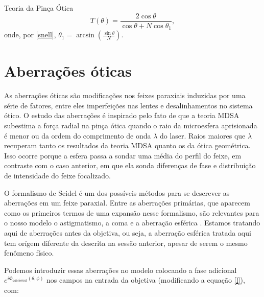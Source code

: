 \begin{chapter}{Teoria da Pinça Ótica}
\begin{equation}
T(\theta)=\frac{2\cos\theta}{\cos\theta + N\cos\theta_1} ,
\label{transmitancia}
\end{equation}
%
onde, por \ref{snell}, $\theta_1=\arcsin(\frac{\sin\theta}{N})$. 

%
%
%
%
\section{Aberrações óticas}

\hspace{5 mm}As aberrações óticas são modificações nos feixes paraxiais induzidas por uma série de fatores, entre eles imperfeições nas lentes e desalinhamentos no sistema ótico. O estudo das aberrações é inspirado pelo fato de que a teoria MDSA subestima a força radial na pinça ótica quando o raio da microesfera aprisionada é menor ou da ordem do comprimento de onda $\lambda$ do laser\cite{Dutra2014}. Raios maiores que $\lambda$ recuperam tanto os resultados da teoria MDSA quanto os da ótica geométrica. Isso ocorre porque a esfera passa a sondar uma média do perfil do feixe, em contraste com o caso anterior, em que ela sonda diferenças de fase e distribuição de intensidade do feixe focalizado.

O formalismo de Seidel é um dos possíveis métodos para se descrever as aberrações em um feixe paraxial. Entre as aberrações primárias, que aparecem como os primeiros termos de uma expansão nesse formalismo, são relevantes para o nosso modelo o astigmatismo, a coma e a aberração esférica \cite{Dutra2014}. Estamos tratando aqui de aberrações antes da objetiva, ou seja, a aberração esférica tratada aqui tem orígem diferente da descrita na sessão anterior, apesar de serem o mesmo fenômeno físico.

Podemos introduzir essas aberrações no modelo colocando a fase adicional $e^{i\Phi_{adicional}(\theta,\phi)}$ nos campos na entrada da objetiva (modificando a equação \ref{l}), com:


\end{chapter}
